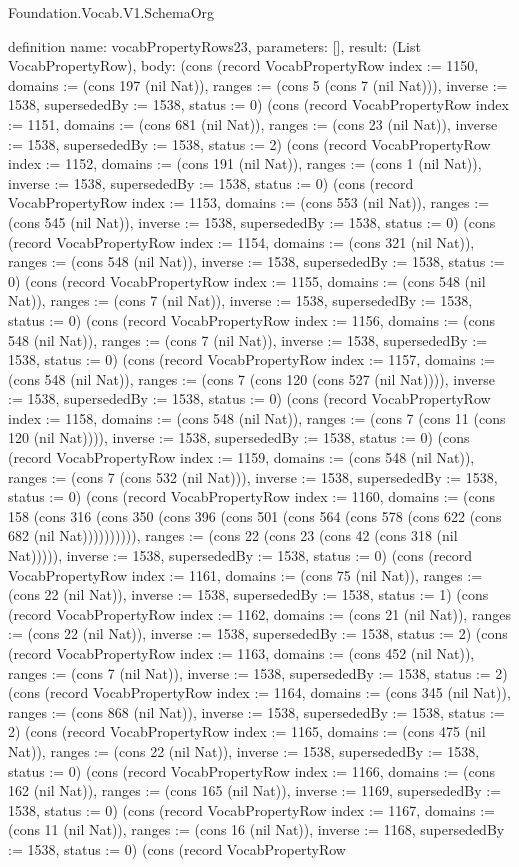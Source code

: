 \begin{lexlean}{Foundation.Vocab.V1.SchemaOrg}
\begin{semanticmodule}
definition{
  name: vocabPropertyRows23,
  parameters: [],
  result: (List VocabPropertyRow),
  body: (cons (record VocabPropertyRow {index := 1150, domains := (cons 197 (nil Nat)), ranges := (cons 5 (cons 7 (nil Nat))), inverse := 1538, supersededBy := 1538, status := 0}) (cons (record VocabPropertyRow {index := 1151, domains := (cons 681 (nil Nat)), ranges := (cons 23 (nil Nat)), inverse := 1538, supersededBy := 1538, status := 2}) (cons (record VocabPropertyRow {index := 1152, domains := (cons 191 (nil Nat)), ranges := (cons 1 (nil Nat)), inverse := 1538, supersededBy := 1538, status := 0}) (cons (record VocabPropertyRow {index := 1153, domains := (cons 553 (nil Nat)), ranges := (cons 545 (nil Nat)), inverse := 1538, supersededBy := 1538, status := 0}) (cons (record VocabPropertyRow {index := 1154, domains := (cons 321 (nil Nat)), ranges := (cons 548 (nil Nat)), inverse := 1538, supersededBy := 1538, status := 0}) (cons (record VocabPropertyRow {index := 1155, domains := (cons 548 (nil Nat)), ranges := (cons 7 (nil Nat)), inverse := 1538, supersededBy := 1538, status := 0}) (cons (record VocabPropertyRow {index := 1156, domains := (cons 548 (nil Nat)), ranges := (cons 7 (nil Nat)), inverse := 1538, supersededBy := 1538, status := 0}) (cons (record VocabPropertyRow {index := 1157, domains := (cons 548 (nil Nat)), ranges := (cons 7 (cons 120 (cons 527 (nil Nat)))), inverse := 1538, supersededBy := 1538, status := 0}) (cons (record VocabPropertyRow {index := 1158, domains := (cons 548 (nil Nat)), ranges := (cons 7 (cons 11 (cons 120 (nil Nat)))), inverse := 1538, supersededBy := 1538, status := 0}) (cons (record VocabPropertyRow {index := 1159, domains := (cons 548 (nil Nat)), ranges := (cons 7 (cons 532 (nil Nat))), inverse := 1538, supersededBy := 1538, status := 0}) (cons (record VocabPropertyRow {index := 1160, domains := (cons 158 (cons 316 (cons 350 (cons 396 (cons 501 (cons 564 (cons 578 (cons 622 (cons 682 (nil Nat)))))))))), ranges := (cons 22 (cons 23 (cons 42 (cons 318 (nil Nat))))), inverse := 1538, supersededBy := 1538, status := 0}) (cons (record VocabPropertyRow {index := 1161, domains := (cons 75 (nil Nat)), ranges := (cons 22 (nil Nat)), inverse := 1538, supersededBy := 1538, status := 1}) (cons (record VocabPropertyRow {index := 1162, domains := (cons 21 (nil Nat)), ranges := (cons 22 (nil Nat)), inverse := 1538, supersededBy := 1538, status := 2}) (cons (record VocabPropertyRow {index := 1163, domains := (cons 452 (nil Nat)), ranges := (cons 7 (nil Nat)), inverse := 1538, supersededBy := 1538, status := 2}) (cons (record VocabPropertyRow {index := 1164, domains := (cons 345 (nil Nat)), ranges := (cons 868 (nil Nat)), inverse := 1538, supersededBy := 1538, status := 2}) (cons (record VocabPropertyRow {index := 1165, domains := (cons 475 (nil Nat)), ranges := (cons 22 (nil Nat)), inverse := 1538, supersededBy := 1538, status := 0}) (cons (record VocabPropertyRow {index := 1166, domains := (cons 162 (nil Nat)), ranges := (cons 165 (nil Nat)), inverse := 1169, supersededBy := 1538, status := 0}) (cons (record VocabPropertyRow {index := 1167, domains := (cons 11 (nil Nat)), ranges := (cons 16 (nil Nat)), inverse := 1168, supersededBy := 1538, status := 0}) (cons (record VocabPropertyRow }
\end{semanticmodule}
\end{lexlean}
